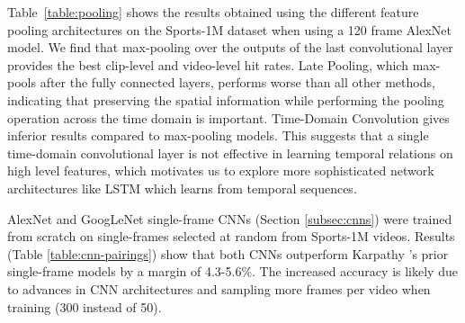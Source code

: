 \documentclass[10pt,twocolumn,letterpaper]{article}
\begin{document}
Table~\ref{table:pooling} shows the results obtained using the
different feature pooling architectures on the Sports-1M dataset when
using a 120 frame AlexNet model. We find that max-pooling over the
outputs of the last convolutional layer provides the best clip-level
and video-level hit rates. Late Pooling, which max-pools after the
fully connected layers, performs worse than all other methods,
indicating that preserving the spatial information while performing
the pooling operation across the time domain is important.
Time-Domain Convolution gives inferior results compared to max-pooling models.
This suggests that a single time-domain convolutional layer is not effective in learning
temporal relations on high level features, which motivates us to explore more sophisticated
network architectures like LSTM which learns from temporal sequences.

\begin{center}
  \begin{table}[t]
\hfill{}
\hfill{}
\vspace{-1em}
\caption{Conv-Pooling outperforms all other feature-pooling architectures (Figure \ref{fig:maxpool}) on Sports-1M using a 120-frame AlexNet model.}
\label{table:pooling}
\end{table}
\end{center}%
AlexNet and GoogLeNet single-frame CNNs (Section \ref{subsec:cnns})
were trained from scratch on single-frames selected at random from
Sports-1M videos. Results (Table \ref{table:cnn-pairings}) show that
both CNNs outperform Karpathy \etal's prior single-frame models
\cite{karpathy2014large} by a margin of 4.3-5.6\%. The increased
accuracy is likely due to advances in CNN architectures and sampling
more frames per video when training (300 instead of 50).
\end{document}
